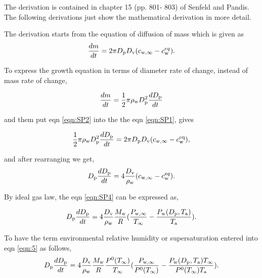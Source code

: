 \documentclass[12pt]{article}
\begin{document}
The derivation is contained in chapter 15 (pp. 801- 803) of Senfeld and Pandis. The following derivations just show the mathematical derivation in more detail.

The derivation starts from the equation of diffusion of mass which is given as
\begin{equation}\label{eqn:SP1}
\frac{dm}{dt}=2 \pi D_{\rm p} D_{\rm v} (c_{\rm w, \infty} - c_{\rm w}^{eq}).  
\end{equation}

To express the growth equation in terms of diameter rate of change, instead of mass rate of change,

\begin{equation}\label{eqn:SP2}
\frac{dm}{dt}=\frac{1}{2} \pi \rho_{\rm w} D_{\rm p}^{2} \frac{dD_{\rm p}}{dt}
\end{equation}

and them put eqn \ref{eqn:SP2} into the the eqn \ref{eqn:SP1}, gives

\begin{equation}\label{eqn:SP3}
\frac{1}{2} \pi \rho_{\rm w} D_{\rm p}^{2} \frac{dD_{\rm p}}{dt}= 2 \pi D_{\rm p} D_{\rm v} (c_{\rm w, \infty} - c_{\rm w}^{\rm eq}),
\end{equation}

and after rearranging we get, 
\begin{equation}\label{eqn:SP4}
D_{\rm p}\frac{dD_{\rm p}}{dt}=4 \frac{D_{\rm v}} {\rho_{\rm w}} (c_{\rm w, \infty} - c_{\rm w}^{eq}).
\end{equation}

By ideal gas law, the eqn \ref{eqn:SP4} can be expressed as,

\begin{equation}\label{eqn:SP5}
D_{\rm p}\frac{dD_{\rm p}}{dt}=4 \frac{D_{\rm v}} {\rho_{\rm w}} \frac{M_{\rm w}}{R} (\frac{P_{\rm w, \infty}}{T_{\infty}} - \frac{P_{\rm w}(D_{\rm p}, T_{\rm a})}{T_{\rm a}}).
\end{equation}

To have the term environmental relative humidity or supersaturation entered into eqn \ref{eqn:5} as follows,  
\begin{equation}\label{eqn:SP6}
D_{\rm p}\frac{dD_{\rm p}}{dt}=4  \frac{D_{\rm v}} {\rho_{\rm w}} \frac{M_{\rm w}}{R} \frac{P^{\rm 0}(T_{\infty})} {T_{\infty}} (\frac{P_{\rm w, \infty}}{P^{\rm 0}(T_{\infty})} - \frac{P_{\rm w}(D_{\rm p}, T_{\rm a}) T_{\infty}}{P^{\rm 0}(T_{\infty}) T_{\rm a}}).
\end{equation}
\end{document}
